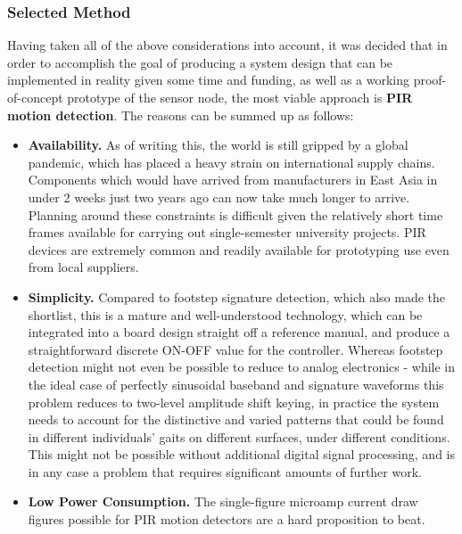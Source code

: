 \documentclass[10pt,nocopyrightspace]{ewsn-proc}
\begin{document}
\subsubsection{Selected Method}
Having taken all of the above considerations into account, it was decided that in order to accomplish the goal of producing a system design that can be implemented in reality given some time and funding, as well as a working proof-of-concept prototype of the sensor node, the most viable approach is \textbf{PIR motion detection}. The reasons can be summed up as follows:
\begin{itemize}
\item \textbf{Availability.} As of writing this, the world is still gripped by a global pandemic, which has placed a heavy strain on international supply chains. Components which would have arrived from manufacturers in East Asia in under 2 weeks just two years ago can now take much longer to arrive. Planning around these constraints is difficult given the relatively short time frames available for carrying out single-semester university projects. PIR devices are extremely common and readily available for prototyping use even from local suppliers.
\item \textbf{Simplicity.} Compared to footstep signature detection, which also made the shortlist, this is a mature and well-understood technology, which can be integrated into a board design straight off a reference manual, and produce a straightforward discrete ON-OFF value for the controller. Whereas footstep detection might not even be possible to reduce to analog electronics - while in the ideal case of perfectly sinusoidal baseband and signature waveforms this problem reduces to two-level amplitude shift keying, in practice the system needs to account for the distinctive and varied patterns that could be found in different individuals’ gaits on different surfaces, under different conditions. This might not be possible without additional digital signal processing, and is in any case a problem that requires significant amounts of further work.
\item \textbf{Low Power Consumption.} The single-figure microamp current draw figures possible for PIR motion detectors are a hard proposition to beat. 
\end{itemize}
\end{document}
